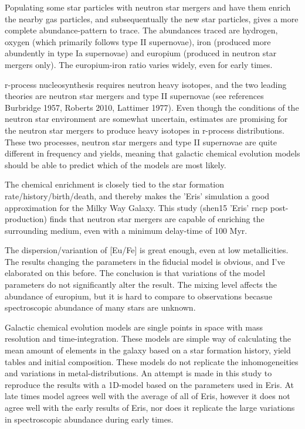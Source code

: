 Populating some star particles with neutron star mergers and have them enrich the nearby gas particles, and subsequentually the new star particles, gives a more complete abundance-pattern to trace.
The abundances traced are hydrogen, oxygen (which primarily follows type II supernovae), iron (produced more abundently in type Ia supernovae) and europium (produced in neutron star mergers only). The europium-iron ratio varies widely, even for early times.

r-process nucleosynthesis requires neutron heavy isotopes, and the two leading theories are neutron star mergers and type II supernovae (see references Burbridge 1957, Roberts 2010, Lattimer 1977). Even though the conditions of the neutron star environment are somewhat uncertain, estimates are promising for the neutron star mergers to produce heavy isotopes in r-process distributions.
These two processes, neutron star mergers and type II supernovae are quite different in frequency and yields, meaning that galactic chemical evolution models should be able to predict which of the models are most likely.

The chemical enrichment is closely tied to the star formation rate/history/birth/death, and thereby makes the 'Eris' simulation a good approximation for the Milky Way Galaxy.
This study (shen15 'Eris' rncp post-production) finds that neutron star mergers are capable of enriching the surrounding medium, even with a minimum delay-time of 100 Myr.

The dispersion/variantion of [Eu/Fe] is great enough, even at low metallicities.
The results changing the parameters in the fiducial model is obvious, and I've elaborated on this before.
The conclusion is that variations of the model parameters do not significantly alter the result.
The mixing level affects the abundance of europium, but it is hard to compare to observations becasue spectroscopic abundance of many stars are unknown.

Galactic chemical evolution models are single points in space with mass resolution and time-integration. These models are simple way of calculating the mean amount of elements in the galaxy based on a star formation history, yield tables and initial composition.
These models do not replicate the inhomogeneities and variations in metal-distributions.
An attempt is made in this study to reproduce the results with a 1D-model based on the parameters used in Eris.
At late times model agrees well with the average of all of Eris, however it does not agree well with the early results of Eris, nor does it replicate the large variations in spectroscopic abundance during early times.
